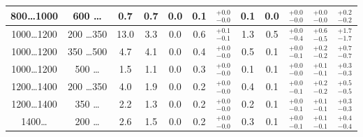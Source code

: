 \begin{table}
\begin{centering}
\begin{tabular}{cc|c|c|c|c|c|c|c|c|c|c}
800\ldots 1000& 600 \ldots		&0.7	&0.7	&0.0	  &0.1	&$_{-0.0}^{+0.0}$	&0.1 		&0.0	   	&$_{-0.0}^{+0.0}$	&$_{-0.0}^{+0.0}$	&$^{+0.2}_{-0.2}$	\\
\hline 
1000\ldots 1200& 200 \ldots 350		&13.0	&3.3	&0.0	  &0.6	&$_{-0.1}^{+0.1}$	&1.3		&0.5	   	&$_{-0.4}^{+0.0}$	&$_{-0.5}^{+0.6}$	&$^{+1.7}_{-1.7}$	\\
1000\ldots 1200& 350 \ldots 500		&4.7	&4.1	&0.0	  &0.4	&$_{-0.0}^{+0.0}$	&0.5 		&0.1	   	&$_{-0.1}^{+0.0}$	&$_{-0.2}^{+0.2}$	&$^{+0.7}_{-0.7}$	\\
1000\ldots 1200& 500 \ldots		&1.5	&1.1	&0.0	  &0.3	&$_{-0.0}^{+0.0}$	&0.1 		&0.1	   	&$_{-0.0}^{+0.0}$	&$_{-0.1}^{+0.1}$	&$^{+0.3}_{-0.3}$	\\
\hline 
1200\ldots 1400& 200 \ldots 350		&4.0	&1.9	&0.0	  &0.2	&$_{-0.0}^{+0.0}$	&0.4 		&0.1	   	&$_{-0.1}^{+0.0}$	&$_{-0.2}^{+0.2}$	&$^{+0.5}_{-0.5}$	\\
1200\ldots 1400& 350 \ldots		&2.2	&1.3	&0.0	  &0.2	&$_{-0.0}^{+0.0}$	&0.2 		&0.1	   	&$_{-0.1}^{+0.0}$	&$_{-0.1}^{+0.1}$	&$^{+0.3}_{-0.3}$	\\
\hline 
1400\ldots& 200 \ldots			&2.6	&1.5	&0.0	  &0.2	&$_{-0.0}^{+0.0}$	&0.3 		&0.1	   	&$_{-0.1}^{+0.0}$	&$_{-0.1}^{+0.1}$	&$^{+0.4}_{-0.4}$	\\
\end{tabular}
\par\end{centering}
\end{table}


\clearpage



